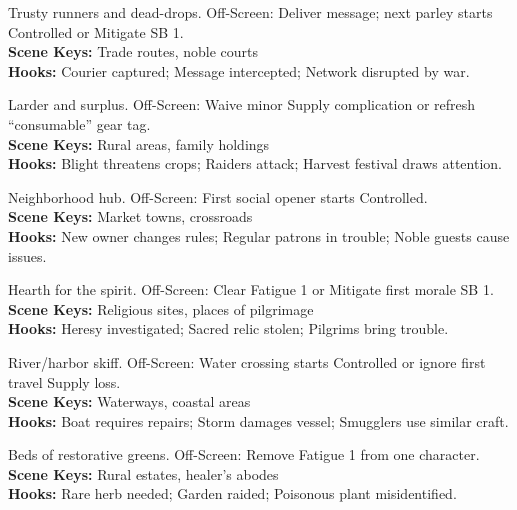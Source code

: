 \documentclass[12pt]{article}
\begin{document}
\begin{description}[leftmargin=*]
  \item[\textbf{Courier Network}] Trusty runners and dead-drops. Off-Screen: Deliver message; next parley starts Controlled or Mitigate SB 1. \\
  \textbf{Scene Keys:} Trade routes, noble courts \\
  \textbf{Hooks:} Courier captured; Message intercepted; Network disrupted by war.

  \item[\textbf{Small Farm/Orchard}] Larder and surplus. Off-Screen: Waive minor Supply complication or refresh ``consumable'' gear tag. \\
  \textbf{Scene Keys:} Rural areas, family holdings \\
  \textbf{Hooks:} Blight threatens crops; Raiders attack; Harvest festival draws attention.

  \item[\textbf{Local Tavern/Inn}] Neighborhood hub. Off-Screen: First social opener starts Controlled. \\
  \textbf{Scene Keys:} Market towns, crossroads \\
  \textbf{Hooks:} New owner changes rules; Regular patrons in trouble; Noble guests cause issues.

  \item[\textbf{Minor Shrine/Temple}] Hearth for the spirit. Off-Screen: Clear Fatigue 1 or Mitigate first morale SB 1. \\
  \textbf{Scene Keys:} Religious sites, places of pilgrimage \\
  \textbf{Hooks:} Heresy investigated; Sacred relic stolen; Pilgrims bring trouble.

  \item[\textbf{Fishing Boat/Barge}] River/harbor skiff. Off-Screen: Water crossing starts Controlled or ignore first travel Supply loss. \\
  \textbf{Scene Keys:} Waterways, coastal areas \\
  \textbf{Hooks:} Boat requires repairs; Storm damages vessel; Smugglers use similar craft.

  \item[\textbf{Herbal Garden}] Beds of restorative greens. Off-Screen: Remove Fatigue 1 from one character. \\
  \textbf{Scene Keys:} Rural estates, healer's abodes \\
  \textbf{Hooks:} Rare herb needed; Garden raided; Poisonous plant misidentified.
\end{description}
\end{document}
